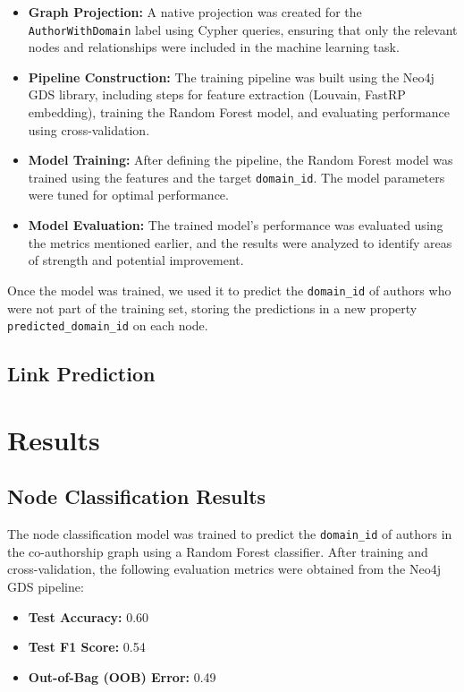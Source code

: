 \documentclass[conference, 12pt]{IEEEtran}
\begin{document}
\begin{itemize}
  \item \textbf{Graph Projection:} A native projection was created for the \texttt{AuthorWithDomain} label using Cypher queries, ensuring that only the relevant nodes and relationships were included in the machine learning task.
  \item \textbf{Pipeline Construction:} The training pipeline was built using the Neo4j GDS library, including steps for feature extraction (Louvain, FastRP embedding), training the Random Forest model, and evaluating performance using cross-validation.
  \item \textbf{Model Training:} After defining the pipeline, the Random Forest model was trained using the features and the target \texttt{domain\_id}. The model parameters were tuned for optimal performance.
  \item \textbf{Model Evaluation:} The trained model's performance was evaluated using the metrics mentioned earlier, and the results were analyzed to identify areas of strength and potential improvement.
\end{itemize}

Once the model was trained, we used it to predict the \texttt{domain\_id} of authors who were not part of the training set, storing the predictions in a new property \texttt{predicted\_domain\_id} on each node.


\subsection{Link Prediction}

\section{Results}


\subsection{Node Classification Results}
The node classification model was trained to predict the \texttt{domain\_id} of authors in the co-authorship graph using a Random Forest classifier. After training and cross-validation, the following evaluation metrics were obtained from the Neo4j GDS pipeline:

\begin{itemize}
  \item \textbf{Test Accuracy:} 0.60
  \item \textbf{Test F1 Score:} 0.54
  \item \textbf{Out-of-Bag (OOB) Error:} 0.49
\end{itemize}
\end{document}
